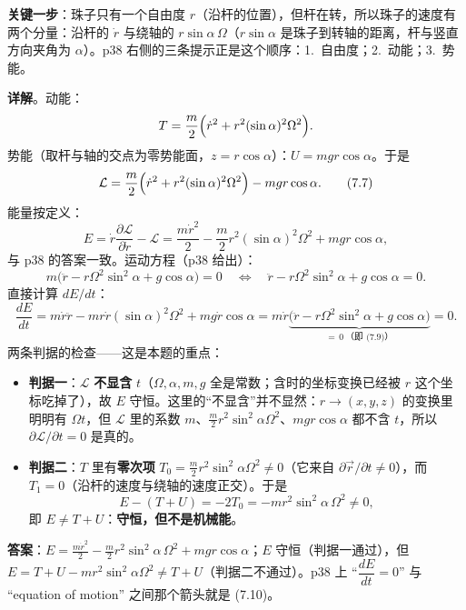 \documentclass[11pt]{ctexart}
\begin{document}
\textbf{关键一步}：珠子只有一个自由度 $r$（沿杆的位置），但杆在转，所以珠子的速度有两个分量：沿杆的 $\dot r$ 与绕轴的 $r\sin\alpha\,\Omega$（$r\sin\alpha$ 是珠子到转轴的距离，杆与竖直方向夹角为 $\alpha$）。p38 右侧的三条提示正是这个顺序：1.\ 自由度；2.\ 动能；3.\ 势能。

\textbf{详解}。动能：
\[
T=\frac{m}{2}\Bigl(\dot r^2+r^2(\sin\alpha)^2\Omega^2\Bigr).
\]
势能（取杆与轴的交点为零势能面，$z=r\cos\alpha$）：$U=mgr\cos\alpha$。于是
\[
\mathcal{L}=\frac{m}{2}\Bigl(\dot r^2+r^2(\sin\alpha)^2\Omega^2\Bigr)-mgr\cos\alpha . \tag{7.7}
\]
能量按定义：
\[
E=\dot r\frac{\partial\mathcal{L}}{\partial\dot r}-\mathcal{L}
=\frac{m\dot r^2}{2}-\frac{m}{2}r^2(\sin\alpha)^2\Omega^2+mgr\cos\alpha , \tag{7.8}
\]
与 p38 的答案一致。运动方程（p38 给出）：
\[
m\bigl(\ddot r-r\Omega^2\sin^2\alpha+g\cos\alpha\bigr)=0
\quad\Longleftrightarrow\quad
\ddot r-r\Omega^2\sin^2\alpha+g\cos\alpha=0 . \tag{7.9}
\]
直接计算 $dE/dt$：
\[
\frac{dE}{dt}=m\dot r\ddot r-mr\dot r(\sin\alpha)^2\Omega^2+mg\dot r\cos\alpha
=m\dot r\underbrace{\bigl(\ddot r-r\Omega^2\sin^2\alpha+g\cos\alpha\bigr)}_{=\,0\ \text{（即 (7.9)）}}=0 . \tag{7.10}
\]
两条判据的检查——这是本题的重点：
\begin{itemize}
\item \textbf{判据一}：$\mathcal{L}$ \textbf{不显含} $t$（$\Omega,\alpha,m,g$ 全是常数；含时的坐标变换已经被 $r$ 这个坐标吃掉了），故 $E$ 守恒。这里的“不显含”并不显然：$r\to(x,y,z)$ 的变换里明明有 $\Omega t$，但 $\mathcal{L}$ 里的系数 $m$、$\frac{m}{2}r^2\sin^2\alpha\Omega^2$、$mgr\cos\alpha$ 都不含 $t$，所以 $\partial\mathcal{L}/\partial t=0$ 是真的。
\item \textbf{判据二}：$T$ 里有\textbf{零次项} $T_0=\frac{m}{2}r^2\sin^2\alpha\Omega^2\ne0$（它来自 $\partial\vec r/\partial t\ne0$），而 $T_1=0$（沿杆的速度与绕轴的速度正交）。于是
\[
E-(T+U)=-2T_0=-mr^2\sin^2\alpha\,\Omega^2\ne0 ,
\]
即 $E\ne T+U$：\textbf{守恒，但不是机械能}。
\end{itemize}


\textbf{答案}：$E=\frac{m\dot r^2}{2}-\frac{m}{2}r^2\sin^2\alpha\,\Omega^2+mgr\cos\alpha$；$E$ 守恒（判据一通过），但 $E=T+U-mr^2\sin^2\alpha\Omega^2\ne T+U$（判据二不通过）。p38 上 “$\dfrac{dE}{dt}=0$” 与 “equation of motion” 之间那个箭头就是 (7.10)。
\end{document}
